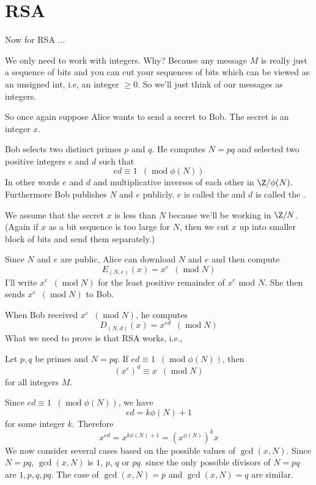 \section{RSA}

Now for RSA $\ldots$

We only need to work with integers. Why? Because any message $M$ is
really just a sequence of bits and you can cut your sequences of
bits which can be viewed as an unsigned int, i.e, an integer $\geq 0$.
So we'll just think of our messages as integers.

So once again suppose Alice wants to send a secret to Bob. The
secret is an integer $x$.

Bob selects two distinct primes $p$ and $q$.
He computes $N = pq$ and selected two positive integers $e$ and $d$
such that
\[
 ed \equiv 1 \,\,\,(\operatorname{mod} \phi(N))
\]
In other words $e$ and $d$ and multiplicative inverses of each
other in $\Z/\phi(N)$.
Furthermore Bob publishes $N$ and $e$ publicly.
$e$ is called the 
and
$d$ is called the .

We assume that the secret $x$ is less than $N$
because we'll be working in $\Z/N$.
(Again if $x$ as a bit sequence is too large for $N$,
then we cut $x$ up into smaller block of bits and send them
separately.)

Since $N$ and $e$ are public, Alice can download $N$ and $e$
and then compute
\[
E_{(N,e)}(x) = x^e \,\,\,(\operatorname{mod} N)
\]
I'll write $x^e \,\,\,(\operatorname{mod} N)$ for the 
least positive remainder of $x^e$ mod $N$.
She then sends $x^e \,\,\,(\operatorname{mod} N)$ to Bob.

When Bob received $x^e \,\,\,(\operatorname{mod} N)$, he computes
\[
D_{(N,d)}(x) = x^{ed} \,\,\,(\operatorname{mod} N)
\]
What we need to prove is that RSA works, i.e.,


\begin{thm}
  Let $p,q$ be primes and $N = pq$.
  If $ed \equiv 1 \,\,\,(\operatorname{mod} \phi(N))$,
  then
  \[
  (x^e)^d \equiv x \,\,\,(\operatorname{mod} N)
  \]
  for all integers $M$.
\end{thm}

\proof
Since $ed \equiv 1 \,\,\,(\operatorname{mod} \phi(N))$, we have
\[
 ed = k \phi(N) + 1
\]
for some integer $k$. Therefore
\[
x^{ed} = x^{k\phi(N) + 1} = (x^{\phi(N)})^k x
\]
We now consider several cases based on the possible values
of $\gcd(x, N)$.
Since $N = pq$, $\gcd(x, N)$ is $1$, $p$, $q$ or $pq$.
since the only possible divisors of $N=pq$ are $1,p,q,pq$.
The case of
$\gcd(x, N) = p$
and
$\gcd(x, N) = q$
are similar.

